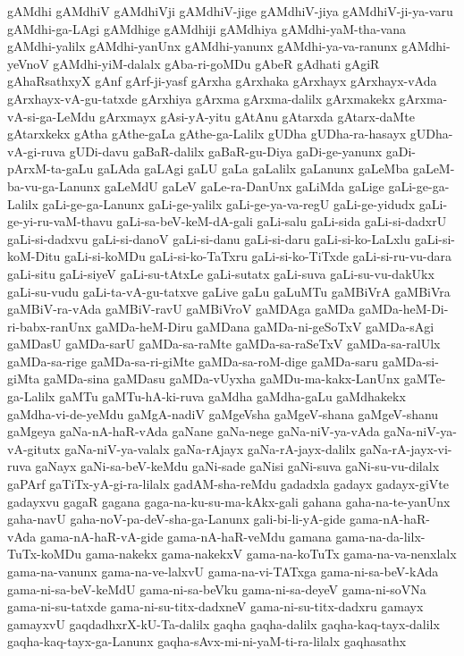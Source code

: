 {gAMdhi
gAMdhiV
gAMdhiVji
gAMdhiV-jige
gAMdhiV-jiya
gAMdhiV-ji-ya-varu
gAMdhi-ga-LAgi
gAMdhige
gAMdhiji
gAMdhiya
gAMdhi-yaM-tha-vana
gAMdhi-yalilx
gAMdhi-yanUnx
gAMdhi-yanunx
gAMdhi-ya-va-ranunx
gAMdhi-yeVnoV
gAMdhi-yiM-dalalx
gAba-ri-goMDu
gAbeR
gAdhati
gAgiR
gAhaRsathxyX
gAnf
gArf-ji-yasf
gArxha
gArxhaka
gArxhayx
gArxhayx-vAda
gArxhayx-vA-gu-tatxde
gArxhiya
gArxma
gArxma-dalilx
gArxmakekx
gArxma-vA-si-ga-LeMdu
gArxmayx
gAsi-yA-yitu
gAtAnu
gAtarxda
gAtarx-daMte
gAtarxkekx
gAtha
gAthe-gaLa
gAthe-ga-Lalilx
gUDha
gUDha-ra-hasayx
gUDha-vA-gi-ruva
gUDi-davu
gaBaR-dalilx
gaBaR-gu-Diya
gaDi-ge-yanunx
gaDi-pArxM-ta-gaLu
gaLAda
gaLAgi
gaLU
gaLa
gaLalilx
gaLanunx
gaLeMba
gaLeM-ba-vu-ga-Lanunx
gaLeMdU
gaLeV
gaLe-ra-DanUnx
gaLiMda
gaLige
gaLi-ge-ga-Lalilx
gaLi-ge-ga-Lanunx
gaLi-ge-yalilx
gaLi-ge-ya-va-regU
gaLi-ge-yidudx
gaLi-ge-yi-ru-vaM-thavu
gaLi-sa-beV-keM-dA-gali
gaLi-salu
gaLi-sida
gaLi-si-dadxrU
gaLi-si-dadxvu
gaLi-si-danoV
gaLi-si-danu
gaLi-si-daru
gaLi-si-ko-LaLxlu
gaLi-si-koM-Ditu
gaLi-si-koMDu
gaLi-si-ko-TaTxru
gaLi-si-ko-TiTxde
gaLi-si-ru-vu-dara
gaLi-situ
gaLi-siyeV
gaLi-su-tAtxLe
gaLi-sutatx
gaLi-suva
gaLi-su-vu-dakUkx
gaLi-su-vudu
gaLi-ta-vA-gu-tatxve
gaLive
gaLu
gaLuMTu
gaMBiVrA
gaMBiVra
gaMBiV-ra-vAda
gaMBiV-ravU
gaMBiVroV
gaMDAga
gaMDa
gaMDa-heM-Di-ri-babx-ranUnx
gaMDa-heM-Diru
gaMDana
gaMDa-ni-geSoTxV
gaMDa-sAgi
gaMDasU
gaMDa-sarU
gaMDa-sa-raMte
gaMDa-sa-raSeTxV
gaMDa-sa-ralUlx
gaMDa-sa-rige
gaMDa-sa-ri-giMte
gaMDa-sa-roM-dige
gaMDa-saru
gaMDa-si-giMta
gaMDa-sina
gaMDasu
gaMDa-vUyxha
gaMDu-ma-kakx-LanUnx
gaMTe-ga-Lalilx
gaMTu
gaMTu-hA-ki-ruva
gaMdha
gaMdha-gaLu
gaMdhakekx
gaMdha-vi-de-yeMdu
gaMgA-nadiV
gaMgeVsha
gaMgeV-shana
gaMgeV-shanu
gaMgeya
gaNa-nA-haR-vAda
gaNane
gaNa-nege
gaNa-niV-ya-vAda
gaNa-niV-ya-vA-gitutx
gaNa-niV-ya-valalx
gaNa-rAjayx
gaNa-rA-jayx-dalilx
gaNa-rA-jayx-vi-ruva
gaNayx
gaNi-sa-beV-keMdu
gaNi-sade
gaNisi
gaNi-suva
gaNi-su-vu-dilalx
gaPArf
gaTiTx-yA-gi-ra-lilalx
gadAM-sha-reMdu
gadadxla
gadayx
gadayx-giVte
gadayxvu
gagaR
gagana
gaga-na-ku-su-ma-kAkx-gali
gahana
gaha-na-te-yanUnx
gaha-navU
gaha-noV-pa-deV-sha-ga-Lanunx
gali-bi-li-yA-gide
gama-nA-haR-vAda
gama-nA-haR-vA-gide
gama-nA-haR-veMdu
gamana
gama-na-da-lilx-TuTx-koMDu
gama-nakekx
gama-nakekxV
gama-na-koTuTx
gama-na-va-nenxlalx
gama-na-vanunx
gama-na-ve-lalxvU
gama-na-vi-TATxga
gama-ni-sa-beV-kAda
gama-ni-sa-beV-keMdU
gama-ni-sa-beVku
gama-ni-sa-deyeV
gama-ni-soVNa
gama-ni-su-tatxde
gama-ni-su-titx-dadxneV
gama-ni-su-titx-dadxru
gamayx
gamayxvU
gaqdadhxrX-kU-Ta-dalilx
gaqha
gaqha-dalilx
gaqha-kaq-tayx-dalilx
gaqha-kaq-tayx-ga-Lanunx
gaqha-sAvx-mi-ni-yaM-ti-ra-lilalx
gaqhasathx
}
